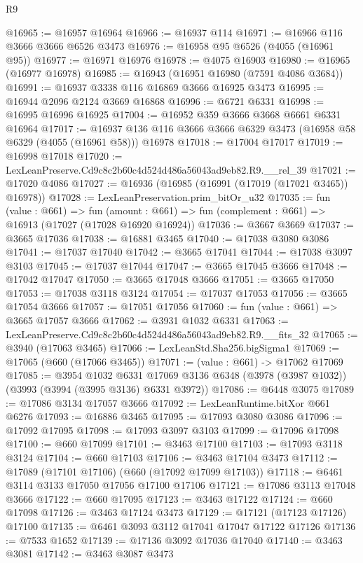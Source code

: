 \begin{lexlean}{R9}
\begin{coremodule}
@16965 := @16957 @16964
@16966 := @16937 @114
@16971 := @16966 @116 @3666 @3666 @6526 @3473
@16976 := @16958 @95 @6526 (@4055 (@16961 @95))
@16977 := @16971 @16976
@16978 := @4075 @16903
@16980 := @16965 (@16977 @16978)
@16985 := @16943 (@16951 @16980 (@7591 @4086 @3684))
@16991 := @16937 @3338 @116 @16869 @3666 @16925 @3473
@16995 := @16944 @2096 @2124 @3669 @16868
@16996 := @6721 @6331
@16998 := @16995 @16996 @16925
@17004 := @16952 @359 @3666 @3668 @6661 @6331 @16964
@17017 := @16937 @136 @116 @3666 @3666 @6329 @3473 (@16958 @58 @6329 (@4055 (@16961 @58))) @16978
@17018 := @17004 @17017
@17019 := @16998 @17018
@17020 := LexLeanPreserve.Cd9c8c2b60c4d524d486a56043ad9eb82.R9.__rel_39
@17021 := @17020 @4086
@17027 := @16936 (@16985 (@16991 (@17019 (@17021 @3465)) @16978))
@17028 := LexLeanPreservation.prim_bitOr_u32
@17035 := fun (value : @661) =>
  fun (amount : @661) => fun (complement : @661) => @16913 (@17027 (@17028 @16920 @16924))
@17036 := @3667 @3669
@17037 := @3665 @17036
@17038 := @16881 @3465
@17040 := @17038 @3080 @3086
@17041 := @17037 @17040
@17042 := @3665 @17041
@17044 := @17038 @3097 @3103
@17045 := @17037 @17044
@17047 := @3665 @17045 @3666
@17048 := @17042 @17047
@17050 := @3665 @17048 @3666
@17051 := @3665 @17050
@17053 := @17038 @3118 @3124
@17054 := @17037 @17053
@17056 := @3665 @17054 @3666
@17057 := @17051 @17056
@17060 := fun (value : @661) => @3665 @17057 @3666
@17062 := @3931 @1032 @6331
@17063 := LexLeanPreserve.Cd9c8c2b60c4d524d486a56043ad9eb82.R9.__fits_32
@17065 := @3940 (@17063 @3465)
@17066 := LexLeanStd.Sha256.bigSigma1
@17069 := @17065 (@660 (@17066 @3465))
@17071 := (value : @661) -> @17062 @17069
@17085 := @3954
    @1032
    @6331
    @17069
    @3136
    @6348
    (@3978 (@3987 @1032))
    (@3993 (@3994 (@3995 @3136) @6331 @3972))
@17086 := @6448 @3075
@17089 := @17086 @3134 @17057 @3666
@17092 := LexLeanRuntime.bitXor @661 @6276
@17093 := @16886 @3465
@17095 := @17093 @3080 @3086
@17096 := @17092 @17095
@17098 := @17093 @3097 @3103
@17099 := @17096 @17098
@17100 := @660 @17099
@17101 := @3463 @17100
@17103 := @17093 @3118 @3124
@17104 := @660 @17103
@17106 := @3463 @17104 @3473
@17112 := @17089 (@17101 @17106) (@660 (@17092 @17099 @17103))
@17118 := @6461 @3114 @3133 @17050 @17056 @17100 @17106
@17121 := @17086 @3113 @17048 @3666
@17122 := @660 @17095
@17123 := @3463 @17122
@17124 := @660 @17098
@17126 := @3463 @17124 @3473
@17129 := @17121 (@17123 @17126) @17100
@17135 := @6461 @3093 @3112 @17041 @17047 @17122 @17126
@17136 := @7533 @1652
@17139 := @17136 @3092 @17036 @17040
@17140 := @3463 @3081
@17142 := @3463 @3087 @3473

\end{coremodule}
\end{lexlean}
